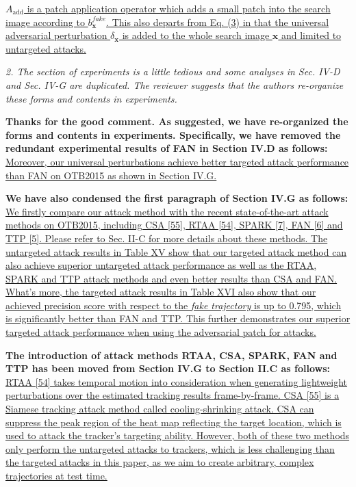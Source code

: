 \documentclass[12pt]{article}
\begin{document}
\uline{$A_{\text{add}}$ is a patch application operator which adds a small patch into the search image according to $b^{fake}_{\textbf{x}}$. This also departs from Eq. (3) in that the universal adversarial perturbation $\delta_\textbf{x}$ is added to the whole search image $\textbf{x}$ and limited to untargeted attacks.}

\textit{2. The section of experiments is a little tedious and some analyses in Sec. IV-D and Sec. IV-G are duplicated. The reviewer suggests that the authors re-organize these forms and contents in experiments.}

\textbf{Thanks for the good comment. As suggested, we have re-organized the forms and contents in experiments. Specifically, we have removed the redundant experimental results of FAN in Section IV.D as follows:} \uline{Moreover, our universal perturbations achieve better targeted attack performance than FAN on OTB2015 as shown in Section IV.G.}

\textbf{We have also condensed the first paragraph of Section IV.G as follows:} \uline{We firstly compare our attack method with the recent state-of-the-art attack methods on OTB2015, including CSA [55], RTAA [54], SPARK [7], FAN [6] and TTP [5]. Please refer to Sec. II-C for more details about these methods. The untargeted attack results in Table XV show that our targeted attack method can also achieve superior untargeted attack performance as well as the RTAA, SPARK and TTP attack methods and even better results than CSA and FAN. What’s more, the targeted attack results in Table XVI also show that our achieved precision score with respect to the \textit{fake trajectory} is up to 0.795, which is significantly better than FAN and TTP. This further demonstrates our superior targeted attack performance when using the adversarial patch for attacks.}

\textbf{The introduction of attack methods RTAA, CSA, SPARK, FAN and TTP has been moved from Section IV.G to Section II.C as follows:} \uline{RTAA [54] takes temporal motion into consideration when generating lightweight perturbations over the estimated tracking results frame-by-frame. CSA [55] is a Siamese tracking attack method called cooling-shrinking attack. CSA can suppress the peak region of the heat map reflecting the target location, which is used to attack the tracker’s targeting ability. However, both of these two methods only perform the untargeted attacks to trackers, which is less challenging than the targeted attacks in this paper, as we aim to create arbitrary, complex trajectories at test time.}
\end{document}
